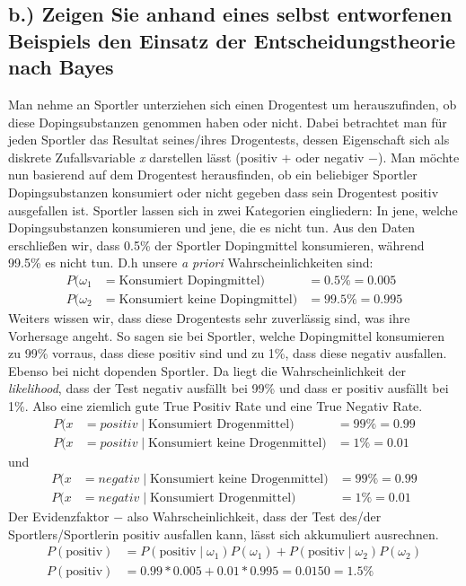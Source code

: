 \subsection*{b.) Zeigen Sie anhand eines selbst entworfenen Beispiels den Einsatz der Entscheidungstheorie nach Bayes}
Man nehme an Sportler unterziehen sich einen Drogentest um herauszufinden, ob diese Dopingsubstanzen genommen haben oder nicht. Dabei betrachtet man für jeden Sportler das Resultat seines/ihres
Drogentests, dessen Eigenschaft sich als diskrete Zufallsvariable \textit{x} darstellen lässt (positiv $+$ oder negativ $-$). Man möchte nun basierend auf dem Drogentest herausfinden, ob ein beliebiger Sportler Dopingsubstanzen konsumiert oder nicht gegeben dass sein Drogentest positiv ausgefallen ist.
Sportler lassen sich in zwei Kategorien eingliedern: In jene, welche Dopingsubstanzen konsumieren und jene, die es nicht tun. Aus den Daten erschließen wir, dass 0.5\% der Sportler Dopingmittel konsumieren, während 99.5\% es nicht tun. D.h unsere \textit{a priori} Wahrscheinlichkeiten sind:
\begin{align*}
	P(\omega_1 &= \text{Konsumiert Dopingmittel}) &= 0.5\% = 0.005\\
	P(\omega_2 &= \text{Konsumiert keine Dopingmittel}) &= 99.5\% = 0.995
\end{align*}
Weiters wissen wir, dass diese Drogentests sehr zuverlässig sind, was ihre Vorhersage angeht. So sagen sie bei
Sportler, welche Dopingmittel konsumieren zu 99\% vorraus, dass diese positiv sind und zu 1\%, dass diese negativ ausfallen.
Ebenso bei nicht dopenden Sportler. Da liegt die Wahrscheinlichkeit der \textit{likelihood}, dass der Test negativ ausfällt bei 99\% und dass er positiv ausfällt bei 1\%. Also eine ziemlich
gute True Positiv Rate und eine True Negativ Rate.
\begin{align*}
	P(x &= positiv\mid \text{Konsumiert Drogenmittel}) &= 99\% = 0.99\\
	P(x &= positiv\mid \text{Konsumiert keine Drogenmittel}) &= 1\% = 0.01
\end{align*}
und
\begin{align*}	
	P(x &= negativ\mid \text{Konsumiert keine Drogenmittel}) &= 99\% = 0.99\\
	P(x &= negativ\mid \text{Konsumiert Drogenmittel}) &= 1\% = 0.01
\end{align*}
Der Evidenzfaktor $-$ also Wahrscheinlichkeit, dass der Test des/der Sportlers/Sportlerin positiv ausfallen kann, lässt sich akkumuliert ausrechnen.
\begin{align*}	
	P(\text{positiv}) &= P(\text{positiv}\mid \omega_1)P(\omega_1) + P(\text{positiv}\mid \omega_2)P(\omega_2)\\
	P(\text{positiv}) &= 0.99 * 0.005 + 0.01 * 0.995 = 0.0150 = 1.5\%	
\end{align*}
